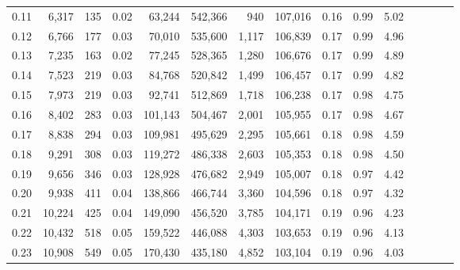 \begin{tabular}{rrrcrrrrrrrrrrr}
0.11 &   6,317 &    135 &                                       0.02 &   63,244 &  542,366 &      940 &  107,016 &  0.16 &  0.99 &                         5.02 \\
0.12 &   6,766 &    177 &                                       0.03 &   70,010 &  535,600 &    1,117 &  106,839 &  0.17 &  0.99 &                         4.96 \\
0.13 &   7,235 &    163 &                                       0.02 &   77,245 &  528,365 &    1,280 &  106,676 &  0.17 &  0.99 &                         4.89 \\
0.14 &   7,523 &    219 &                                       0.03 &   84,768 &  520,842 &    1,499 &  106,457 &  0.17 &  0.99 &                         4.82 \\
0.15 &   7,973 &    219 &                                       0.03 &   92,741 &  512,869 &    1,718 &  106,238 &  0.17 &  0.98 &                         4.75 \\
0.16 &   8,402 &    283 &                                       0.03 &  101,143 &  504,467 &    2,001 &  105,955 &  0.17 &  0.98 &                         4.67 \\
0.17 &   8,838 &    294 &                                       0.03 &  109,981 &  495,629 &    2,295 &  105,661 &  0.18 &  0.98 &                         4.59 \\
0.18 &   9,291 &    308 &                                       0.03 &  119,272 &  486,338 &    2,603 &  105,353 &  0.18 &  0.98 &                         4.50 \\
0.19 &   9,656 &    346 &                                       0.03 &  128,928 &  476,682 &    2,949 &  105,007 &  0.18 &  0.97 &                         4.42 \\
0.20 &   9,938 &    411 &                                       0.04 &  138,866 &  466,744 &    3,360 &  104,596 &  0.18 &  0.97 &                         4.32 \\
0.21 &  10,224 &    425 &                                       0.04 &  149,090 &  456,520 &    3,785 &  104,171 &  0.19 &  0.96 &                         4.23 \\
0.22 &  10,432 &    518 &                                       0.05 &  159,522 &  446,088 &    4,303 &  103,653 &  0.19 &  0.96 &                         4.13 \\
0.23 &  10,908 &    549 &                                       0.05 &  170,430 &  435,180 &    4,852 &  103,104 &  0.19 &  0.96 &                         4.03 \\

\end{tabular}
